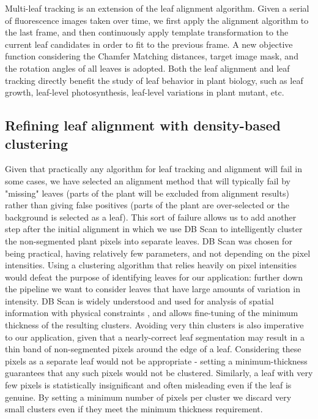 \documentclass{bioinfo}
\begin{document}
Multi-leaf tracking is an extension of the leaf alignment algorithm. Given a serial of fluorescence images  taken over time, we first apply the alignment algorithm to the last frame, and then continuously apply template transformation to the current leaf candidates in order to fit to the previous frame. A new objective function considering the Chamfer Matching distances, target image mask, and the rotation angles of all leaves is adopted.
%
Both the leaf alignment and leaf tracking directly benefit the study of leaf behavior in plant biology, such as leaf growth, leaf-level photosynthesis, leaf-level variations in plant mutant, etc.

\subsection{Refining leaf alignment with density-based clustering}

Given that practically any algorithm for leaf tracking and alignment will fail in some cases, we have selected an alignment method that will typically fail by "missing" leaves (parts of the plant will be excluded from alignment results) rather than giving false positives (parts of the plant are over-selected or the background is selected as a leaf). This sort of failure allows us to add another step after the initial alignment in which we use DB Scan \citep{kriegel2011density} to intelligently cluster the non-segmented plant pixels into separate leaves. DB Scan was chosen for being practical, having relatively few parameters, and not depending on the pixel intensities. Using a clustering algorithm that relies heavily on pixel intensities would defeat the purpose of identifying leaves for our application: further down the pipeline we want to consider leaves that have large amounts of variation in intensity. DB Scan is widely understood and used for analysis of spatial information with physical constraints \citep{zaiane2002clustering}, and allows fine-tuning of the minimum thickness of the resulting clusters. Avoiding very thin clusters is also imperative to our application, given that a nearly-correct leaf segmentation may result in a thin band of non-segmented pixels around the edge of a leaf. Considering these pixels as a separate leaf would not be appropriate - setting a minimum-thickness guarantees that any such pixels would not be clustered. Similarly, a leaf with very few pixels is statistically insignificant and often misleading even if the leaf is genuine. By setting a minimum number of pixels per cluster we discard very small clusters even if they meet the minimum thickness requirement.
\end{document}
